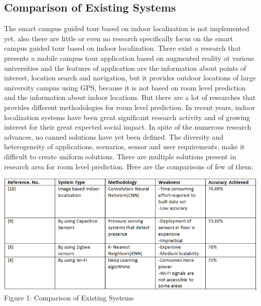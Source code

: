 \documentclass{article}
\begin{document}
\subsection{Comparison of Existing Systems}
The smart campus guided tour based on indoor localization is not implemented yet, also there are little or even no research specifically focus on the smart campus guided tour based on indoor localization. There exist a research that presents a mobile campus tour application based on augmented reality at various universities and the features of application are the information about points of interest, location search and navigation, but it provides outdoor locations of large university campus using GPS, because it is not based on room level prediction and the information about indoor locations. But there are a lot of researches that provides different methodologies for room level prediction. In recent years, indoor localization systems have been great significant research activity and of growing interest for their great expected social impact. In spite of the numerous research advances, no canned solutions have yet been defined. The diversity and heterogeneity of applications, scenarios, sensor and user requirements, make it difficult to create uniform solutions. There are multiple solutions present in research area for room level prediction\cite{wei2018end}. Here are the comparisons of few of them:


\begin{center}
\includegraphics[scale=0.8]{abc}
\\Figure 1: Comparison of Existing Systems
\label{fig:five}
\end{center}
\end{document}
